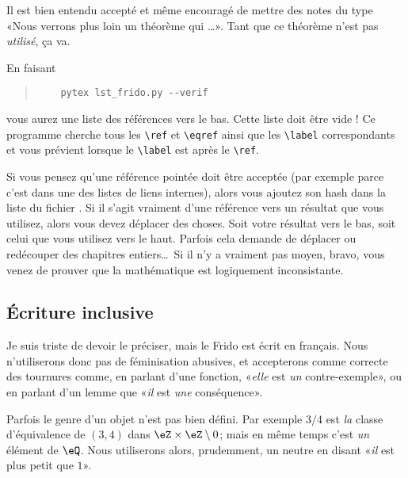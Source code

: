 Il est bien entendu accepté et même encouragé de mettre des notes du type «Nous verrons plus loin un théorème qui \ldots». Tant que ce théorème n'est pas \emph{utilisé}, ça va.

En faisant
\begin{quote}
    \begin{verbatim}
    pytex lst_frido.py --verif
    \end{verbatim}
\end{quote}
vous aurez une liste des références vers le bas. Cette liste doit être vide ! Ce programme cherche tous les \verb+\ref+ et \verb+\eqref+ ainsi que les \verb+\label+ correspondants et vous prévient lorsque le \verb+\label+ est après le \verb+\ref+.

Si vous pensez qu'une référence pointée doit être acceptée (par exemple parce c'est dans une des listes de liens internes), alors vous ajoutez son hash dans la liste du fichier . Si il s'agit vraiment d'une référence vers un résultat que vous utilisez, alors vous devez déplacer des choses. Soit votre résultat vers le bas, soit celui que vous utilisez vers le haut. Parfois cela demande de déplacer ou redécouper des chapitres entiers\ldots\ Si il n'y a vraiment pas moyen, bravo, vous venez de prouver que la mathématique est logiquement inconsistante.

\subsection{Écriture inclusive}

Je suis triste de devoir le préciser, mais le Frido est écrit en français. Nous n'utiliserons donc pas de féminisation abusives, et accepterons comme correcte des tournures comme, en parlant d'une fonction, «\emph{elle} est \emph{un} contre-exemple», ou en parlant d'un lemme que «\emph{il} est \emph{une} conséquence».

Parfois le genre d'un objet n'est pas bien défini. Par exemple \( 3/4\) est \emph{la} classe d'équivalence de \( (3,4)\) dans \( \eZ\times \eZ\setminus{0}\); mais en même temps c'est \emph{un} élément de \( \eQ\). Nous utiliserons alors, prudemment, un neutre en disant «\emph{il} est plus petit que \( 1\)».

